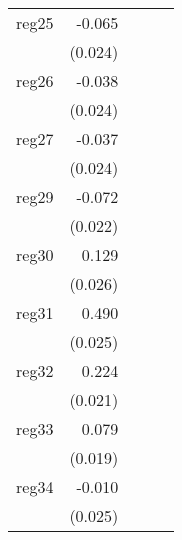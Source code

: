 {\begin{longtable}{l*{4}{D{.}{.}{-1}}}
\addlinespace
reg25       &      -0.065\sym{**} &                     &                     &                     \\
            &     (0.024)         &                     &                     &                     \\
\addlinespace
reg26       &      -0.038         &                     &                     &                     \\
            &     (0.024)         &                     &                     &                     \\
\addlinespace
reg27       &      -0.037         &                     &                     &                     \\
            &     (0.024)         &                     &                     &                     \\
\addlinespace
reg29       &      -0.072\sym{**} &                     &                     &                     \\
            &     (0.022)         &                     &                     &                     \\
\addlinespace
reg30       &       0.129\sym{***}&                     &                     &                     \\
            &     (0.026)         &                     &                     &                     \\
\addlinespace
reg31       &       0.490\sym{***}&                     &                     &                     \\
            &     (0.025)         &                     &                     &                     \\
\addlinespace
reg32       &       0.224\sym{***}&                     &                     &                     \\
            &     (0.021)         &                     &                     &                     \\
\addlinespace
reg33       &       0.079\sym{***}&                     &                     &                     \\
            &     (0.019)         &                     &                     &                     \\
\addlinespace
reg34       &      -0.010         &                     &                     &                     \\
            &     (0.025)         &                     &                     &                     \\

\end{longtable}}
